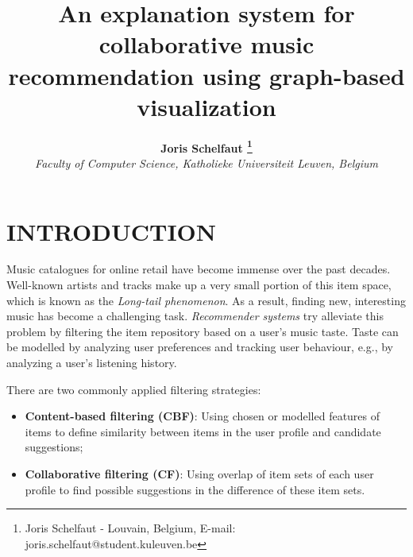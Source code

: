 \documentclass[a4paper,10pt,twocolumn]{article}
\title{\bf
	An explanation system for collaborative music recommendation using graph-based visualization
}
\author{
        \small{\bf
        	Joris Schelfaut
        	\footnote{
        			Joris Schelfaut - Louvain, Belgium, E-mail: joris.schelfaut@student.kuleuven.be
        }} \\
        \small{\emph{
        	Faculty of Computer Science, Katholieke Universiteit Leuven, Belgium
        }}
}
\date{}
\begin{document}
\maketitle


\section{INTRODUCTION}\label{section:introduction}


Music catalogues for online retail have become immense over the past decades. Well-known artists and tracks make up a very small portion of this item space, which is known as the \emph{Long-tail phenomenon}. As a result, finding new, interesting music has become a challenging task. \emph{Recommender systems} try alleviate this problem by filtering the item repository based on a user's music taste. Taste can be modelled by analyzing user preferences and tracking user behaviour, e.g., by analyzing a user's listening history.

There are two commonly applied filtering strategies\cite{rajaraman:2012}:

\begin{itemize}
	\item \textbf{Content-based filtering (CBF)}: Using chosen or modelled features of items to define similarity between items in the user profile and candidate suggestions;
	\item \textbf{Collaborative filtering (CF)}: Using overlap of item sets of each user profile to find possible suggestions in the difference of these item sets.
\end{itemize}
\end{document}
